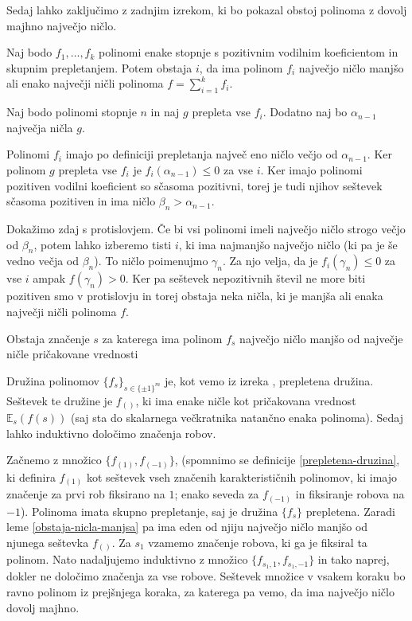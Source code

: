 Sedaj lahko zaključimo z zadnjim izrekom, ki bo pokazal obstoj polinoma z dovolj majhno največjo ničlo.

\begin{lema}\label{obstaja-nicla-manjsa}
    Naj bodo \(f_1, \ldots, f_k\) polinomi enake stopnje s pozitivnim vodilnim koeficientom in skupnim prepletanjem. Potem obstaja \(i\), da ima polinom \(f_i\) največjo ničlo manjšo ali enako največji ničli polinoma \(f=\sum_{i=1}^k f_i\).
\end{lema}
\begin{dokaz}
    Naj bodo polinomi stopnje \(n\) in naj \(g\) prepleta vse \(f_i\). Dodatno naj bo \(\alpha_{n-1}\) največja ničla \(g\). 
    
    Polinomi \(f_i\) imajo po definiciji prepletanja največ eno ničlo večjo od \(\alpha_{n-1}\). Ker polinom \(g\) prepleta vse \(f_i\) je \(f_i(\alpha_{n-1})\leq0\) za vse \(i\). Ker imajo polinomi pozitiven vodilni koeficient so sčasoma pozitivni, torej je tudi njihov seštevek sčasoma pozitiven in ima ničlo \(\beta_n > \alpha_{n-1}\).

    Dokažimo zdaj s protislovjem. Če bi vsi polinomi imeli največjo ničlo strogo večjo od \(\beta_n\), potem lahko izberemo tisti \(i\), ki ima najmanjšo največjo ničlo (ki pa je še vedno večja od \(\beta_n\)). To ničlo poimenujmo \(\gamma_n\). Za njo velja, da je \(f_i(\gamma_n) \leq 0\) za vse \(i\) ampak \(f(\gamma_n) > 0\). Ker pa seštevek nepozitivnih števil ne more biti pozitiven smo v protislovju in torej obstaja neka ničla, ki je manjša ali enaka največji ničli polinoma \(f\).
\end{dokaz}

\begin{izrek}
    Obstaja značenje \(s\) za katerega ima polinom \(f_s\) največjo ničlo manjšo od največje ničle pričakovane vrednosti
\end{izrek}
\begin{dokaz}
    Družina polinomov \(\{f_s\}_{s\in\{\pm1\}^m}\) je, kot vemo iz izreka \label{karakteristicni-so-prepleteni}, prepletena družina. Seštevek te družine je \(f_{()}\), ki ima enake ničle kot pričakovana vrednost \(\mathbb E_{s}(f(s))\) (saj sta do skalarnega večkratnika natančno enaka polinoma). Sedaj lahko induktivno določimo značenja robov.

    Začnemo z množico \(\{f_{(1)}, f_{(-1)}\}\), (spomnimo se definicije \ref{prepletena-druzina}, ki definira \(f_{(1)}\) kot seštevek vseh značenih karakterističnih polinomov, ki imajo značenje za prvi rob fiksirano na \(1\); enako seveda za \(f_{(-1)}\) in fiksiranje robova na \(-1\)). Polinoma imata skupno prepletanje, saj je družina \(\{f_s\}\) prepletena. Zaradi leme \ref{obstaja-nicla-manjsa} pa ima eden od njiju največjo ničlo manjšo od njunega seštevka \(f_{()}\). Za \(s_1\) vzamemo značenje robova, ki ga je fiksiral ta polinom. Nato nadaljujemo induktivno z množico \(\{f_{s_1, 1}, f_{s_1, -1}\}\) in tako naprej, dokler ne določimo značenja za vse robove. Seštevek množice v vsakem koraku bo ravno polinom iz prejšnjega koraka, za katerega pa vemo, da ima največjo ničlo dovolj majhno. 
\end{dokaz}


